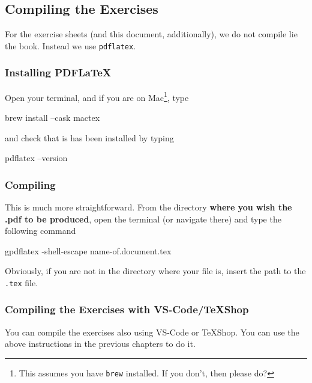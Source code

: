 \documentclass{article}
\begin{document}
\subsection{Compiling the Exercises}

For the exercise sheets (and this document, additionally), we do not compile lie the book. Instead we use \texttt{pdflatex}. 
\subsubsection{Installing PDFLaTeX}
Open your terminal, and if you are on Mac\footnote{This assumes you have \texttt{brew} installed. If you don't, then please do?}, type 
\begin{bashcode}
    brew install --cask mactex
 \end{bashcode}
 and check that is has been installed by typing 
 \begin{bashcode}
    pdflatex --version
\end{bashcode}
\subsubsection{Compiling}
This is much more straightforward. From the directory \textbf{where you wish the .pdf to be produced}, open the terminal (or navigate there) and type the following command
\begin{bashcode}
    gpdflatex -shell-escape name-of.document.tex
\end{bashcode}
Obviously, if you are not in the directory where your file is, insert the path to the \texttt{.tex} file.

\subsubsection{Compiling the Exercises with VS-Code/TeXShop}
You can compile the exercises also using VS-Code or TeXShop. You can use the above instructions in the previous chapters to do it.
\newpage
\end{document}
